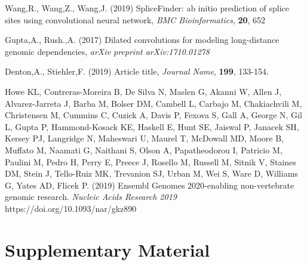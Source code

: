 \documentclass{bioinfo}
\begin{document}
\begin{thebibliography}{}
Wang,R., Wang,Z., Wang,J. (2019) SpliceFinder: ab initio prediction of splice sites using convolutional neural network, {\it BMC Bioinformatics}, {\bf 20}, 652

Gupta,A., Rush.,A. (2017) Dilated convolutions for modeling long-distance genomic dependencies, {\it arXiv preprint arXiv:1710.01278}

Denton,A., Stiehler,F. (2019) Article title, {\it Journal Name}, {\bf 199}, 133-154.

Howe KL, Contreras-Moreira B, De Silva N, Maslen G, Akanni W, Allen J, Alvarez-Jarreta J, Barba M, Bolser DM, Cambell L, Carbajo M, Chakiachvili M, Christensen M, Cummins C, Cuzick A, Davis P, Fexova S, Gall A, George N, Gil L, Gupta P, Hammond-Kosack KE, Haskell E, Hunt SE, Jaiswal P, Janacek SH, Kersey PJ, Langridge N, Maheswari U, Maurel T, McDowall MD, Moore B, Muffato M, Naamati G, Naithani S, Olson A, Papatheodorou I, Patricio M, Paulini M, Pedro H, Perry E, Preece J, Rosello M, Russell M, Sitnik V, Staines DM, Stein J, Tello-Ruiz MK, Trevanion SJ, Urban M, Wei S, Ware D, Williams G, Yates AD, Flicek P. (2019) Ensembl Genomes 2020-enabling non-vertebrate genomic research. {\it Nucleic Acids Research 2019} https://doi.org/10.1093/nar/gkz890

\end{thebibliography}

\newpage

\section{Supplementary Material}
\end{document}
